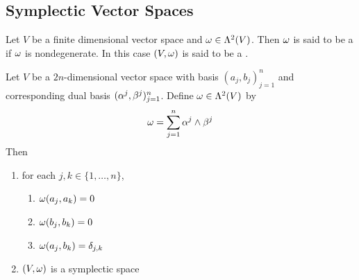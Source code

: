 \documentclass{book}
\begin{document}
	
	
	
	
	
	
	
	
	
	
	
	
	
	
	
	
	
	
	
	
	
	
	
	
	
	
	
	
	
	
	
	
	
	
	
	
	
	
	\subsection{Symplectic Vector Spaces}
	
	\begin{defn}
		Let $V$ be a finite dimensional vector space and $\omega \in \Lambda^2(V)$. Then $\omega$ is said to be a  if $\omega$ is nondegenerate. In this case $(V, \omega)$ is said to be a .
	\end{defn}
	
	\begin{ex}
		Let $V$ be a $2n$-dimensional vector space with basis $(a_j, b_j)_{j=1}^n$ and corresponding dual basis $(\alpha^j, \beta^j)_{j=1}^n$. Define $\omega \in \Lambda^2(V)$ by 
		$$\omega = \sum_{j=1}^n \alpha^j \wedge \beta^j$$
		Then 
		\begin{enumerate}
			\item for each $j,k \in \{1, \ldots, n\}$, 
			\begin{enumerate}
				\item $\omega(a_j, a_k) = 0$
				\item $\omega(b_j, b_k) = 0$
				\item $\omega(a_j, b_k) = \delta_{j,k}$
			\end{enumerate}
			\item $(V, \omega)$ is a symplectic space
		\end{enumerate}
	\end{ex}
	
\end{document}
